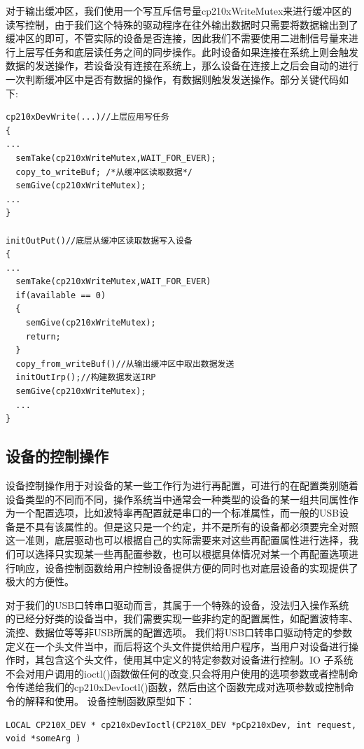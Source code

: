 	对于输出缓冲区，我们使用一个写互斥信号量cp210xWriteMutex来进行缓冲区的读写控制，由于我们这个特殊的驱动程序在往外输出数据时只需要将数据输出到了缓冲区的即可，不管实际的设备是否连接，因此我们不需要使用二进制信号量来进行上层写任务和底层读任务之间的同步操作。此时设备如果连接在系统上则会触发数据的发送操作，若设备没有连接在系统上，那么设备在连接上之后会自动的进行一次判断缓冲区中是否有数据的操作，有数据则触发发送操作。部分关键代码如下:

\lstset{language=C}
\begin{lstlisting}
cp210xDevWrite(...)//上层应用写任务
{
...	
  semTake(cp210xWriteMutex,WAIT_FOR_EVER);
  copy_to_writeBuf; /*从缓冲区读取数据*/
  semGive(cp210xWriteMutex);
...
}

initOutPut()//底层从缓冲区读取数据写入设备
{
...
  semTake(cp210xWriteMutex,WAIT_FOR_EVER)
  if(available == 0)
  {
	semGive(cp210xWriteMutex);
	return;
  }	
  copy_from_writeBuf()//从输出缓冲区中取出数据发送
  initOutIrp();//构建数据发送IRP
  semGive(cp210xWriteMutex);
  ...
}
\end{lstlisting}  





\subsection{设备的控制操作}
	设备控制操作用于对设备的某一些工作行为进行再配置，可进行的在配置类别随着设备类型的不同而不同，操作系统当中通常会一种类型的设备的某一组共同属性作为一个配置选项，比如波特率再配置就是串口的一个标准属性，而一般的USB设备是不具有该属性的。但是这只是一个约定，并不是所有的设备都必须要完全对照这一准则，底层驱动也可以根据自己的实际需要来对这些再配置属性进行选择，我们可以选择只实现某一些再配置参数，也可以根据具体情况对某一个再配置选项进行响应，设备控制函数给用户控制设备提供方便的同时也对底层设备的实现提供了极大的方便性。
	
	对于我们的USB口转串口驱动而言，其属于一个特殊的设备，没法归入操作系统的已经分好类的设备当中，我们需要实现一些非约定的配置属性，如配置波特率、流控、数据位等等非USB所属的配置选项。
	我们将USB口转串口驱动特定的参数定义在一个头文件当中，而后将这个头文件提供给用户程序，当用户对设备进行操作时，其包含这个头文件，使用其中定义的特定参数对设备进行控制。IO 子系统不会对用户调用的ioctl()函数做任何的改变,只会将用户使用的选项参数或者控制命令传递给我们的cp210xDevIoctl()函数，然后由这个函数完成对选项参数或控制命令的解释和使用。
设备控制函数原型如下：
\lstset{language=C}
\begin{lstlisting}
LOCAL CP210X_DEV * cp210xDevIoctl(CP210X_DEV *pCp210xDev, int request, void *someArg )
\end{lstlisting}

